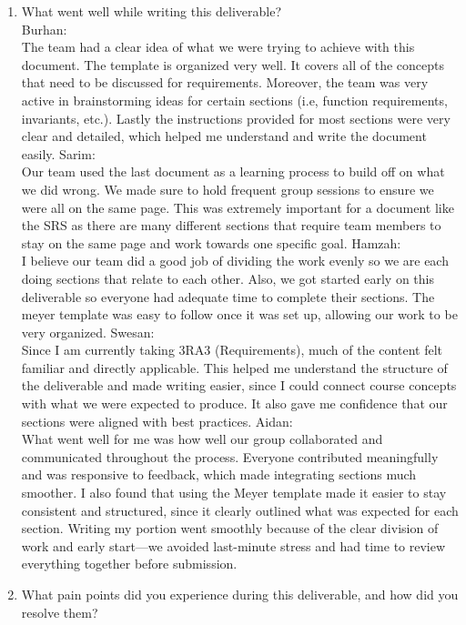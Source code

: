 \documentclass[12pt,letterpaper]{article}
\begin{document}
\begin{enumerate} 

\item What went well while writing this deliverable?  \\
\vspace{1em}
Burhan: \\
The team had a clear idea of what we were trying to achieve with this document. The template is organized very well. It covers all of the concepts that need to be discussed for requirements. Moreover, the team was very active in brainstorming ideas for certain sections (i.e, function requirements, invariants, etc.). Lastly the instructions provided for most sections were very clear and detailed, which helped me understand and write the document easily.  
\vspace{1em}
Sarim: \\
Our team used the last document as a learning process to build off on what we did wrong. We made sure to hold frequent group sessions to ensure we were all on the same page. This was extremely important for a document like the SRS as there are many different sections that require team members to stay on the same page and work towards one specific goal.
\vspace{1em}
Hamzah: \\
I believe our team did a good job of dividing the work evenly so we are each doing sections that relate to each other. Also, we got started early on this deliverable so everyone had adequate time to complete their sections. The meyer template was easy to follow once it was set up, allowing our work to be very organized. 
\vspace{1em}
Swesan: \\
Since I am currently taking 3RA3 (Requirements), much of the content felt familiar and directly applicable. This helped me understand the structure of the deliverable and made writing easier, since I could connect course concepts with what we were expected to produce. It also gave me confidence that our sections were aligned with best practices. 
\vspace{1em}
Aidan: \\
What went well for me was how well our group collaborated and communicated throughout the process. Everyone contributed meaningfully and was responsive to feedback, which made integrating sections much smoother. I also found that using the Meyer template made it easier to stay consistent and structured, since it clearly outlined what was expected for each section. Writing my portion went smoothly because of the clear division of work and early start—we avoided last-minute stress and had time to review everything together before submission.  
\vspace{1em}
\item What pain points did you experience during this deliverable, and how did you resolve them? \\
\vspace{1em}


\end{enumerate}
\end{document}
